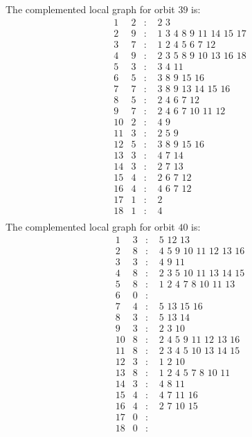 \documentclass[12pt]{article}
\begin{document}
The complemented local graph for orbit $39$ is:
\begin{equation*}
\begin{array}{rrcl}
1&2&:&\,\,2\,\,3\\
2&9&:&\,\,1\,\,3\,\,4\,\,8\,\,9\,\,11\,\,14\,\,15\,\,17\\
3&7&:&\,\,1\,\,2\,\,4\,\,5\,\,6\,\,7\,\,12\\
4&9&:&\,\,2\,\,3\,\,5\,\,8\,\,9\,\,10\,\,13\,\,16\,\,18\\
5&3&:&\,\,3\,\,4\,\,11\\
6&5&:&\,\,3\,\,8\,\,9\,\,15\,\,16\\
7&7&:&\,\,3\,\,8\,\,9\,\,13\,\,14\,\,15\,\,16\\
8&5&:&\,\,2\,\,4\,\,6\,\,7\,\,12\\
9&7&:&\,\,2\,\,4\,\,6\,\,7\,\,10\,\,11\,\,12\\
10&2&:&\,\,4\,\,9\\
11&3&:&\,\,2\,\,5\,\,9\\
12&5&:&\,\,3\,\,8\,\,9\,\,15\,\,16\\
13&3&:&\,\,4\,\,7\,\,14\\
14&3&:&\,\,2\,\,7\,\,13\\
15&4&:&\,\,2\,\,6\,\,7\,\,12\\
16&4&:&\,\,4\,\,6\,\,7\,\,12\\
17&1&:&\,\,2\\
18&1&:&\,\,4\\
\end{array}
\end{equation*}
The complemented local graph for orbit $40$ is:
\begin{equation*}
\begin{array}{rrcl}
1&3&:&\,\,5\,\,12\,\,13\\
2&8&:&\,\,4\,\,5\,\,9\,\,10\,\,11\,\,12\,\,13\,\,16\\
3&3&:&\,\,4\,\,9\,\,11\\
4&8&:&\,\,2\,\,3\,\,5\,\,10\,\,11\,\,13\,\,14\,\,15\\
5&8&:&\,\,1\,\,2\,\,4\,\,7\,\,8\,\,10\,\,11\,\,13\\
6&0&:&\\
7&4&:&\,\,5\,\,13\,\,15\,\,16\\
8&3&:&\,\,5\,\,13\,\,14\\
9&3&:&\,\,2\,\,3\,\,10\\
10&8&:&\,\,2\,\,4\,\,5\,\,9\,\,11\,\,12\,\,13\,\,16\\
11&8&:&\,\,2\,\,3\,\,4\,\,5\,\,10\,\,13\,\,14\,\,15\\
12&3&:&\,\,1\,\,2\,\,10\\
13&8&:&\,\,1\,\,2\,\,4\,\,5\,\,7\,\,8\,\,10\,\,11\\
14&3&:&\,\,4\,\,8\,\,11\\
15&4&:&\,\,4\,\,7\,\,11\,\,16\\
16&4&:&\,\,2\,\,7\,\,10\,\,15\\
17&0&:&\\
18&0&:&\\
\end{array}
\end{equation*}
\end{document}
